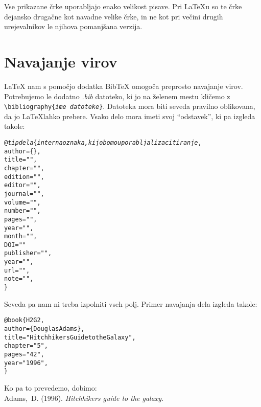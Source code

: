 \documentclass[a4paper]{book}
\newcommand\tbs{\textbackslash{}}
\begin{document}
Vse prikazane črke uporabljajo enako velikost pisave. Pri \LaTeX{}u so te črke dejansko drugačne kot navadne velike črke, in ne kot pri večini drugih urejevalnikov le njihova pomanjšana verzija.


\section{Navajanje virov}

\LaTeX{} nam s pomočjo dodatka Bib\TeX{} omogoča preprosto navajanje virov. Potrebujemo le dodatno \textit{.bib} datoteko, ki jo na želenem mestu kličemo z \texttt{\tbs{}bibliography\{\textit{ime datoteke}\}}. Datoteka mora biti seveda pravilno oblikovana, da jo \LaTeX lahko prebere.
Vsako delo mora imeti svoj ``odstavek'', ki pa izgleda takole:

\begin{alltt}

@\textit{tip dela}\{\textit{interna oznaka, ki jo bomo uporabljali za citiranje},
  author = \{\},
  title = "",
  chapter = "",
  edition = "",
  editor = "",
  journal = "",
  volume = "",
  number = "",
  pages = "",
  year = "",
  month = "",
  DOI = ""
  publisher = "",
  year = "",
  url = "",
  note = "",
\}

\end{alltt}

Seveda pa nam ni treba izpolniti vseh polj. Primer navajanja dela izgleda takole:

\begin{alltt}

@book \{H2G2,
  author = \{Douglas Adams\},
  title = "Hitchhikers Guide to the Galaxy",
  chapter = "5",
  pages = "42",
  year = "1996",
\}

\end{alltt}

Ko pa to prevedemo, dobimo:\\

\noindent{}Adams,~D. (1996). \textit{Hitchhikers guide to the galaxy}.





\nocite{*}
\end{document}
